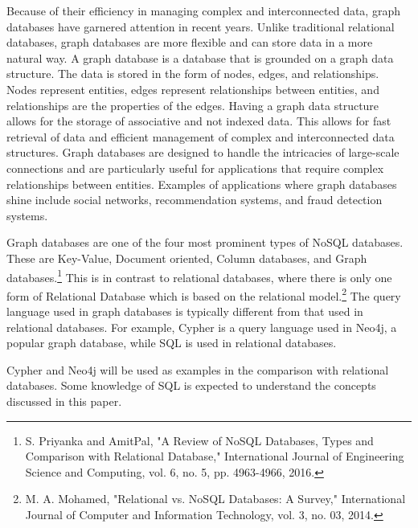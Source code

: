 
Because of their efficiency in managing complex and interconnected data, graph databases have garnered attention in recent years. Unlike traditional relational databases, graph databases are more flexible and can store data in a more natural way. A graph database is a database that is grounded on a graph data structure. The data is stored in the form of nodes, edges, and relationships. Nodes represent entities, edges represent relationships between entities, and relationships are the properties of the edges. Having a graph data structure allows for the storage of associative and not indexed data. This allows for fast retrieval of data and efficient management of complex and interconnected data structures. Graph databases are designed to handle the intricacies of large-scale connections and are particularly useful for applications that require complex relationships between entities. Examples of applications where graph databases shine include social networks, recommendation systems, and fraud detection systems. 

Graph databases are one of the four most prominent types of NoSQL databases. These are Key-Value, Document oriented, Column databases, and Graph databases.\footnote{S. Priyanka and AmitPal, "A Review of NoSQL Databases, Types and Comparison with Relational Database," International Journal of Engineering Science and Computing, vol. 6, no. 5, pp. 4963-4966, 2016.} This is in contrast to relational databases, where there is only one form of Relational Database which is based on the relational model.\footnote{M. A. Mohamed, "Relational vs. NoSQL Databases: A Survey," International Journal of Computer and Information Technology, vol. 3, no. 03, 2014.} The query language used in graph databases is typically different from that used in relational databases. For example, Cypher is a query language used in Neo4j, a popular graph database, while SQL is used in relational databases. 

Cypher and Neo4j will be used as examples in the comparison with relational databases. Some knowledge of SQL is expected to understand the concepts discussed in this paper.

